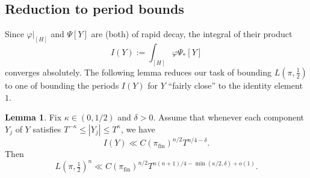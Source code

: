 \documentclass[reqno]{amsart}
\DeclareMathOperator{\fin}{fin}
\theoremstyle{plain} \newtheorem{theorem} {Theorem}
\theoremstyle{definition} \newtheorem{definition} [theorem] {Definition}
\theoremstyle{itplain} %
\newtheorem{lemma}[theorem]{Lemma}
\numberwithin{equation}{section}
\numberwithin{theorem}{section}
\renewcommand{\leq}{\leqslant}
\begin{document}
\subsection{Reduction to period bounds}\label{sec:reduct-peri-bounds}
Since $\varphi|_{[H]}$ and $\Psi[Y]$ are (both) of rapid decay, the integral of their product
\begin{equation*}
  I(Y) := \int_{[H]} \varphi \Psi_{\ast}[Y]
\end{equation*}
converges absolutely.  The following lemma reduces our task of bounding $L(\pi,\tfrac{1}{2})$ to one of bounding the periods $I(Y)$ for $Y$ ``fairly close'' to the identity element $1$.

\begin{lemma}\label{lem:sub-gln:fix-kappa-in}
  Fix $\kappa \in (0,1/2)$ and $\delta > 0$.  Assume that whenever each component $Y_j$ of $Y$ satisfies $T^{-\kappa} \leq |Y_j| \leq T^{\kappa}$, we have
  \begin{equation}\label{eq:iy-ll-tn4}
    I(Y) \ll C(\pi_{\fin})^{n/2} T^{n/4 -\delta}.
  \end{equation}
  Then
  \begin{equation}\label{eq:lpi-tfrac12n-ll_eps}
    L(\pi,\tfrac{1}{2})^{n} \ll
    C(\pi_{\fin})^{n/2}
    T^{n(n+1)/4 - \min(\kappa/2,\delta) + o(1)}.
  \end{equation}
\end{lemma}
\end{document}
